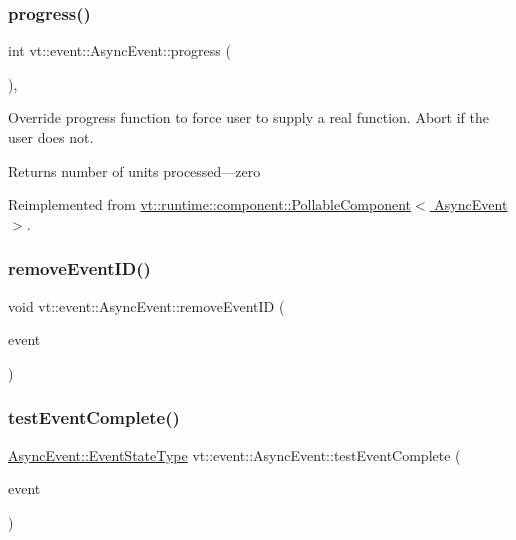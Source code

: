 \subsubsection{\texorpdfstring{progress()}{progress()}}
{\footnotesize\ttfamily int vt\+::event\+::\+Async\+Event\+::progress (\begin{DoxyParamCaption}{ }\end{DoxyParamCaption})\hspace{0.3cm}{\ttfamily [override]}, {\ttfamily [virtual]}}



Override progress function to force user to supply a real function. Abort if the user does not. 

\begin{DoxyReturn}{Returns}
number of units processed---zero 
\end{DoxyReturn}


Reimplemented from \hyperlink{structvt_1_1runtime_1_1component_1_1_pollable_component_a34cad810026224d550cd9b0c9d1eff22}{vt\+::runtime\+::component\+::\+Pollable\+Component$<$ Async\+Event $>$}.

\mbox{\label{structvt_1_1event_1_1_async_event_a67a603eff81f5f912118f38fd5cbaccb}} 
\subsubsection{\texorpdfstring{remove\+Event\+I\+D()}{removeEventID()}}
{\footnotesize\ttfamily void vt\+::event\+::\+Async\+Event\+::remove\+Event\+ID (\begin{DoxyParamCaption}\item[{\hyperlink{namespacevt_a009267401def7ae8bf201892222d060f}{Event\+Type} const \&}]{event }\end{DoxyParamCaption})}

\mbox{\label{structvt_1_1event_1_1_async_event_ac14b4e2fc658f70937c591dfdc8ea083}} 
\subsubsection{\texorpdfstring{test\+Event\+Complete()}{testEventComplete()}}
{\footnotesize\ttfamily \hyperlink{namespacevt_1_1event_a787aca6361696d96d817a639195c429c}{Async\+Event\+::\+Event\+State\+Type} vt\+::event\+::\+Async\+Event\+::test\+Event\+Complete (\begin{DoxyParamCaption}\item[{\hyperlink{namespacevt_a009267401def7ae8bf201892222d060f}{Event\+Type} const \&}]{event }\end{DoxyParamCaption})}

